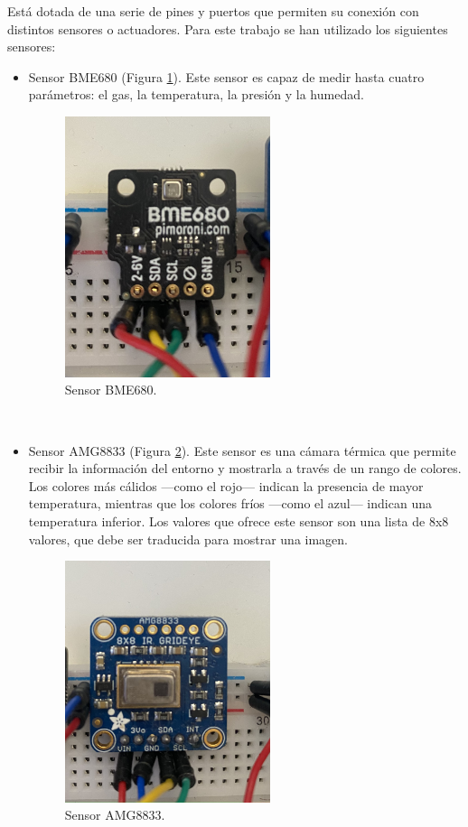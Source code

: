 Está dotada de una serie de pines y puertos que permiten su conexión con distintos sensores o actuadores. Para este trabajo se han utilizado los siguientes sensores:
\begin{itemize}
\item{Sensor BME680 (Figura \ref{fig:bme}).} Este sensor es capaz de medir hasta cuatro parámetros: el gas, la temperatura, la presión y la humedad.
\begin{figure} [h!]
  \begin{center}
    \includegraphics[width=6cm]{figs/bme}
  \end{center}
  \caption{Sensor BME680.}
  \label{fig:bme}
\end{figure}\\

\item{Sensor AMG8833 (Figura \ref{fig:amg}).} Este sensor es una cámara térmica que permite recibir la información del entorno y mostrarla a través de un rango de colores. Los colores más cálidos ---como el rojo--- indican la presencia de mayor temperatura, mientras que los colores fríos ---como el azul--- indican una temperatura inferior. Los valores que ofrece este sensor son una lista de 8x8 valores, que debe ser traducida para mostrar una imagen.
\begin{figure} [h!]
  \begin{center}
    \includegraphics[width=6cm]{figs/amg}
  \end{center}
  \caption{Sensor AMG8833.}
  \label{fig:amg}
\end{figure}\\


\end{itemize}
